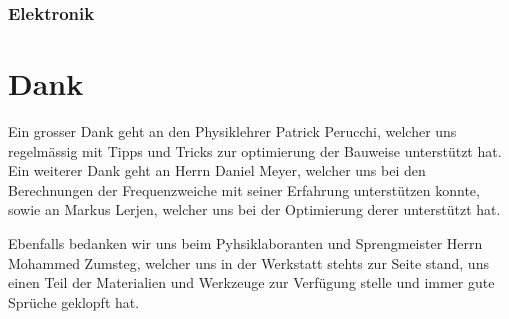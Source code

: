 \documentclass[a4paper,11pt]{report}
\begin{document}
\subsection{Elektronik}

\chapter*{Dank}
Ein grosser Dank geht an den Physiklehrer Patrick Perucchi, welcher uns regelmässig mit Tipps und Tricks zur optimierung der Bauweise unterstützt hat.
Ein weiterer Dank geht an Herrn Daniel Meyer, welcher uns bei den Berechnungen der Frequenzweiche mit seiner Erfahrung unterstützen konnte, sowie an Markus Lerjen, welcher uns bei der Optimierung derer unterstützt hat.

Ebenfalls bedanken wir uns beim Pyhsiklaboranten und Sprengmeister Herrn Mohammed Zumsteg, welcher uns in der Werkstatt stehts zur Seite stand, uns einen Teil der Materialien und Werkzeuge zur Verfügung stelle und immer gute Sprüche geklopft hat.

\newpage
\listoffigures

\newpage


\end{document}
